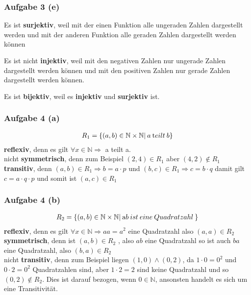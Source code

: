 \documentclass[a4paper, 10pt]{scrartcl}
\begin{document}
\subsubsection*{Aufgabe 3 \small(e)}
\begin{flushleft}
    Es ist \textbf{surjektiv}, weil mit der einen Funktion alle ungeraden Zahlen dargestellt werden und mit der anderen Funktion alle geraden Zahlen dargestellt werden können
\end{flushleft}
\begin{flushleft}
    Es ist nicht \textbf{injektiv}, weil mit den negativen Zahlen nur ungerade Zahlen dargestellt werden können und mit den positiven Zahlen nur gerade Zahlen dargestellt werden können.
\end{flushleft} 
\begin{flushleft}
    Es ist \textbf{bijektiv}, weil es \textbf{injektiv} und \textbf{surjektiv} ist.
\end{flushleft}

\subsubsection*{Aufgabe 4 \small(a)}
\begin{align}
    R_1 = \{(a, b) \in \mathbb{N} \times \mathbb{N} |\: a \:\text teilt \: b\} \notag 
\end{align}
\textbf{reflexiv}, denn es gilt $\forall x \in \mathbb{N} \Rightarrow $ a teilt  a. \\
nicht \textbf{symmetrisch}, denn zum Beispiel $(2, 4) \in R_1$ aber $(4, 2) \notin R_1$ \\
\textbf{transitiv}, denn $(a, b) \in R_1 \Rightarrow b = a \cdot p$ und $(b, c) \in R_1 \Rightarrow c = b \cdot q$ damit gilt $c = a \cdot q \cdot p$ und somit ist $(a, c) \in R_1$

\subsubsection*{Aufgabe 4 \small(b)}
\begin{align}
    R_2 = \{(a, b) \in \mathbb{N} \times \mathbb{N} |\:\text ab \: ist \: eine \: Quadratzahl \:\} \notag 
\end{align}
\textbf{reflexiv}, denn es gilt $\forall x \in \mathbb{N} \Rightarrow aa = a^2$ eine Quadratzahl also $(a, a) \in R_2$  \\
\textbf{symmetrisch}, denn ist $(a, b) \in R_2$ , also $ab$ eine Quadratzahl so ist auch $ba$ eine Quadratzahl, also $(b, a) \in R_2$ \\
nicht \textbf{transitiv}, denn zum Beispiel liegen $(1, 0) \wedge (0, 2)$, da $1 \cdot 0 = 0^2$ und $0 \cdot 2 = 0^2$ Quadratzahlen sind, aber $1 \cdot 2 = 2$ sind keine Quadratzahl und so $(0, 2) \notin R_2$. Dies ist darauf bezogen, wenn $0 \in \mathbb{N}$, ansonsten handelt es sich um eine Transitivität.
\end{document}
